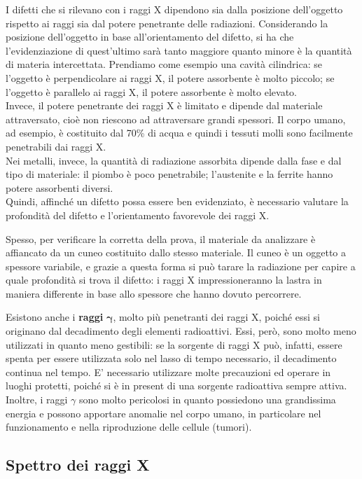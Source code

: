 I difetti che si rilevano con i raggi X dipendono sia dalla posizione dell’oggetto rispetto ai raggi sia dal potere penetrante delle radiazioni.
Considerando la posizione dell’oggetto in base all’orientamento del difetto, si ha che l’evidenziazione di quest’ultimo sarà tanto maggiore quanto minore è la quantità di materia intercettata. Prendiamo come esempio una cavità cilindrica: se l’oggetto è perpendicolare ai raggi X, il potere assorbente è molto piccolo; se l’oggetto è parallelo ai raggi X, il potere assorbente è molto elevato.\\
Invece, il potere penetrante dei raggi X è limitato e dipende dal materiale attraversato, cioè non riescono ad attraversare grandi spessori. Il corpo umano, ad esempio, è costituito dal 70\% di acqua e quindi i tessuti molli sono facilmente penetrabili dai raggi X.\\
Nei metalli, invece, la quantità di radiazione assorbita dipende dalla fase e dal tipo di materiale: il piombo è poco penetrabile; l’austenite e la ferrite hanno potere assorbenti diversi.\\
Quindi, affinché un difetto possa essere ben evidenziato, è necessario valutare la profondità del difetto e l’orientamento favorevole dei raggi X.

Spesso, per verificare la corretta della prova, il materiale da analizzare è affiancato da un cuneo costituito dallo stesso materiale. Il cuneo è un oggetto a spessore variabile, e grazie a questa forma si può tarare la radiazione per capire a quale profondità si trova il difetto: i raggi X impressioneranno la lastra in maniera differente in base allo spessore che hanno dovuto percorrere.

Esistono anche i \textbf{raggi} $\boldsymbol\gamma$, molto più penetranti dei raggi X, poiché essi si originano dal decadimento degli elementi radioattivi. Essi, però, sono molto meno utilizzati in quanto meno gestibili: se la sorgente di raggi X può, infatti, essere spenta per essere utilizzata solo nel lasso di tempo necessario, il decadimento continua nel tempo. E’ necessario utilizzare molte precauzioni ed operare in luoghi protetti, poiché si è in present di una sorgente radioattiva sempre attiva.
Inoltre, i raggi $\gamma$ sono molto pericolosi in quanto possiedono una grandissima energia e possono apportare anomalie nel corpo umano, in particolare nel funzionamento e nella riproduzione delle cellule (tumori).

\subsection{Spettro dei raggi X}

